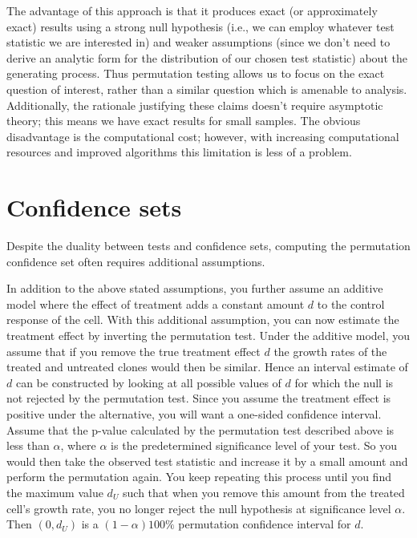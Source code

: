 The advantage of this approach is that it produces exact (or approximately
exact) results using a strong null hypothesis (i.e., we can employ whatever
test statistic we are interested in) and weaker assumptions (since we don't
need to derive an analytic form for the distribution of our chosen test
statistic) about the generating process. Thus permutation testing allows us to
focus on the exact question of interest, rather than a similar question which
is amenable to analysis.  Additionally, the rationale justifying these claims
doesn't require asymptotic theory; this means we have exact results for small
samples.  The obvious disadvantage is the computational cost; however, with
increasing computational resources and improved algorithms this limitation
is less of a problem.

\section{Confidence sets}

Despite the duality between tests and confidence sets, computing the permutation
confidence set often requires additional assumptions.  

\begin{example}[continues=exa:cont] In addition to the above stated
assumptions, you further assume an additive model where the effect of treatment
adds a constant amount $d$ to the control response of the cell.  With this
additional assumption, you can now estimate the treatment effect by inverting
the permutation test.  Under the additive model, you assume that if you remove
the true treatment effect $d$ the growth rates of the treated and untreated
clones would then be similar.  Hence an interval estimate of $d$ can be
constructed by looking at all possible values of $d$ for which the null is not
rejected by the permutation test.  Since you assume the treatment effect is
positive under the alternative, you will want a one-sided confidence interval.
Assume that the p-value calculated by the permutation test described above is
less than $\alpha$, where $\alpha$ is the predetermined significance level of
your test.  So you would then take the observed test statistic and increase it
by a small amount and perform the permutation again.  You keep repeating this
process until you find the maximum value $d_U$ such that when you remove this
amount from the treated cell's growth rate, you no longer reject the null
hypothesis at significance level $\alpha$.  Then $(0, d_U)$ is a $(1-\alpha)100\%$
permutation confidence interval for $d$.
\end{example}

